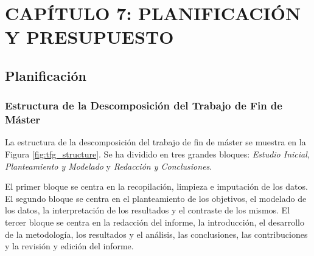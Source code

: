 \section{CAPÍTULO 7: PLANIFICACIÓN Y PRESUPUESTO}\label{cap:results}

\subsection{Planificación}\label{sec:planificacion}

\subsubsection{Estructura de la Descomposición del Trabajo de Fin de Máster}\label{sec:edt}

La estructura de la descomposición del trabajo de fin de máster se muestra en la Figura \ref{fig:tfg_structure}. Se ha dividido en tres grandes bloques: \textit{Estudio Inicial}, \textit{Planteamiento y Modelado} y \textit{Redacción y Conclusiones}. 

El primer bloque se centra en la recopilación, limpieza e imputación de los datos. El segundo bloque se centra en el planteamiento de los objetivos, el modelado de los datos, la interpretación de los resultados y el contraste de los mismos. El tercer bloque se centra en la redacción del informe, la introducción, el desarrollo de la metodología, los resultados y el análisis, las conclusiones, las contribuciones y la revisión y edición del informe.

